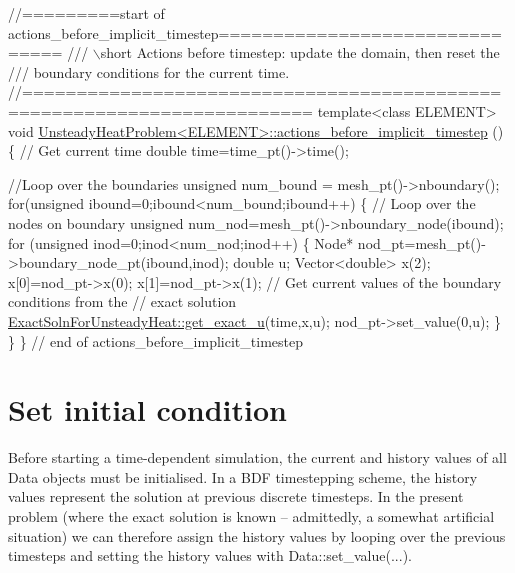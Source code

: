 \begin{DoxyCodeInclude}
\textcolor{comment}{//=========start of actions\_before\_implicit\_timestep===============================}
\textcolor{comment}{/// \(\backslash\)short Actions before timestep: update the domain, then reset the }
\textcolor{comment}{}\textcolor{comment}{/// boundary conditions for the current time.}
\textcolor{comment}{}\textcolor{comment}{//========================================================================}
\textcolor{keyword}{template}<\textcolor{keyword}{class} ELEMENT>
\textcolor{keywordtype}{void} \hyperlink{classUnsteadyHeatProblem_a7074e52f6a3a791549687e1b4ddd059a}{UnsteadyHeatProblem<ELEMENT>::actions\_before\_implicit\_timestep}
      ()
\{
 \textcolor{comment}{// Get current time}
 \textcolor{keywordtype}{double} time=time\_pt()->time();
 
 \textcolor{comment}{//Loop over the boundaries}
 \textcolor{keywordtype}{unsigned} num\_bound = mesh\_pt()->nboundary();
 \textcolor{keywordflow}{for}(\textcolor{keywordtype}{unsigned} ibound=0;ibound<num\_bound;ibound++)
  \{
   \textcolor{comment}{// Loop over the nodes on boundary}
   \textcolor{keywordtype}{unsigned} num\_nod=mesh\_pt()->nboundary\_node(ibound);
   \textcolor{keywordflow}{for} (\textcolor{keywordtype}{unsigned} inod=0;inod<num\_nod;inod++)
    \{
     Node* nod\_pt=mesh\_pt()->boundary\_node\_pt(ibound,inod);
     \textcolor{keywordtype}{double} u;
     Vector<double> x(2);
     x[0]=nod\_pt->x(0);
     x[1]=nod\_pt->x(1);
     \textcolor{comment}{// Get current values of the boundary conditions from the}
     \textcolor{comment}{// exact solution}
     \hyperlink{namespaceExactSolnForUnsteadyHeat_a1d5b22857bd2a7825397daf1cf9c89eb}{ExactSolnForUnsteadyHeat::get\_exact\_u}(time,x,u);
     nod\_pt->set\_value(0,u);
    \}
  \}
\} \textcolor{comment}{// end of actions\_before\_implicit\_timestep}

\end{DoxyCodeInclude}




 

\hypertarget{index_IC}{}\section{Set initial condition}\label{index_IC}
Before starting a time-\/dependent simulation, the current and history values of all {\ttfamily Data} objects must be initialised. In a {\ttfamily B\+DF} timestepping scheme, the history values represent the solution at previous discrete timesteps. In the present problem (where the exact solution is known -- admittedly, a somewhat artificial situation) we can therefore assign the history values by looping over the previous timesteps and setting the history values with {\ttfamily Data\+::set\+\_\+value}(...).


